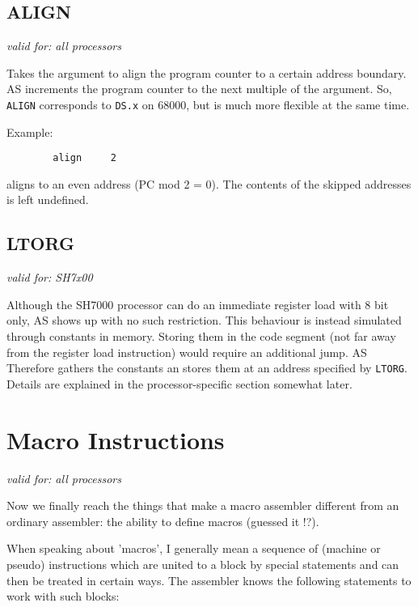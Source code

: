 \documentclass[12pt,twoside]{report}
\makeatletter
\newcommand{\tty}[1]{{\tt #1}}
\newcommand{\ttindex}[1]{\index{#1@{\tt #1}}}
\makeatother
\begin{document}
\subsection{ALIGN}
\ttindex{ALIGN}

{\em valid for: all processors}

Takes the argument to align the program counter to a certain address
boundary.  AS increments the program counter to the next multiple of the
argument.  So, \tty{ALIGN} corresponds to \tty{DS.x} on 68000, but is much
more flexible at the same time.

Example:
\begin{verbatim}
        align     2
\end{verbatim}
aligns to an even address (PC mod 2 = 0).  The contents of the
skipped addresses is left undefined.


\subsection{LTORG}
\ttindex{LTORG}

{\em valid for: SH7x00}

Although the SH7000 processor can do an immediate register load with
8 bit only, AS shows up with no such restriction.  This behaviour is
instead simulated through constants in memory.  Storing them in
the code segment (not far away from the register load instruction)
would require an additional jump.  AS Therefore gathers the constants
an stores them at an address specified by \tty{LTORG}.  Details are
explained in the processor-specific section somewhat later.


\section{Macro Instructions}

{\em valid for: all processors}

Now we finally reach the things that make a macro assembler different
from an ordinary assembler: the ability to define macros (guessed
it !?).

When speaking about 'macros', I generally mean a sequence of (machine
or pseudo) instructions which are united to a block by special
statements and can then be treated in certain ways.  The assembler
knows the following statements to work with such blocks:
\end{document}
